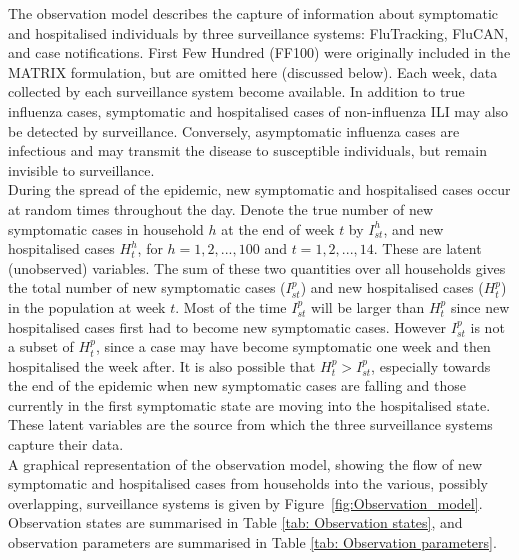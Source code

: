 The observation model describes the capture of information about symptomatic and hospitalised individuals by three surveillance systems: FluTracking, FluCAN, and case notifications. First Few Hundred (FF100) were originally included in the MATRIX formulation, but are omitted here (discussed below). Each week, data collected by each surveillance system become available. In addition to true influenza cases, symptomatic and hospitalised cases of non-influenza ILI may also be detected by surveillance. Conversely, asymptomatic influenza cases are infectious and may transmit the disease to susceptible individuals, but remain invisible to surveillance.  \\
During the spread of the epidemic, new symptomatic and hospitalised cases occur at random times throughout the day. Denote the true number of new symptomatic cases in household $h$ at the end of week $t$ by $I_{st}^h$, and new hospitalised cases $H_t^h$, for $h=1,2,...,100$ and $t=1,2,...,14$. These are latent (unobserved) variables. The sum of these two quantities over all households gives the total number of new symptomatic cases ($I_{st}^p$) and new hospitalised cases ($H_t^p$) in the population at week $t$. Most of the time $I_{st}^p$ will be larger than $H_t^p$ since new hospitalised cases first had to become new symptomatic cases. However $I_{st}^p$ is not a subset of $H_t^p$, since a case may have become symptomatic one week and then hospitalised the week after. It is also possible that $H_t^p > I_{st}^p$, especially towards the end of the epidemic when new symptomatic cases are falling and those currently in the first symptomatic state are moving into the hospitalised state. These latent variables are the source from which the three surveillance systems capture their data. \\
A graphical representation of the observation model, showing the flow of new symptomatic and hospitalised cases from households into the various, possibly overlapping, surveillance systems is given by Figure~\ref{fig:Observation_model}.
Observation states are summarised in Table \ref{tab: Observation states}, and observation parameters are summarised in Table \ref{tab: Observation parameters}.
